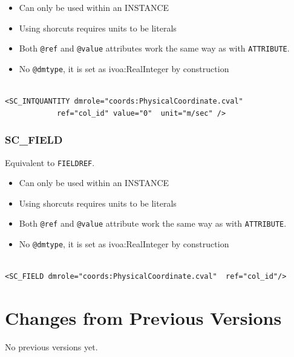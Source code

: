 \documentclass[11pt,a4paper]{ivoa}
\begin{document}
\begin{itemize}
    \item Can only be used within an INSTANCE        
    \item Using shorcuts requires units to be literals    
    \item Both \texttt{@ref} and \texttt{@value} attributes work the same way as with \texttt{ATTRIBUTE}.
    \item No \texttt{@dmtype},  it is set as ivoa:RealInteger by construction
 \end{itemize}


\begin{lstlisting}[caption={\texttt{ivoa:IntegerQuantity} example},style=XML,basicstyle=\small]

<SC_INTQUANTITY dmrole="coords:PhysicalCoordinate.cval"
            ref="col_id" value="0"  unit="m/sec" />
\end{lstlisting}

\subsubsection{SC\_FIELD}
Equivalent to \texttt{FIELDREF}.


\begin{itemize}
    \item Can only be used within an INSTANCE        
    \item Using shorcuts requires units to be literals    
    \item Both \texttt{@ref} and \texttt{@value} attribute work the same way as with \texttt{ATTRIBUTE}.
    \item No \texttt{@dmtype},  it is set as ivoa:RealInteger by construction
 \end{itemize}


\begin{lstlisting}[caption={\texttt{ivoa:IntegerQuantity} example},style=XML,basicstyle=\small]

<SC_FIELD dmrole="coords:PhysicalCoordinate.cval"  ref="col_id"/>
\end{lstlisting}


\appendix

\section{Changes from Previous Versions}

No previous versions yet.  



\end{document}
